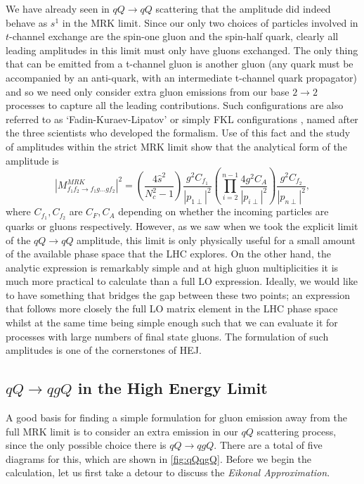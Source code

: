 We have already seen in $qQ \to qQ$ scattering that the amplitude did indeed behave as $s^1$ in the MRK limit. Since our only two choices of particles involved in $t$-channel exchange are the spin-one gluon and the spin-half quark, clearly all leading amplitudes in this limit must only have gluons exchanged. The only thing that can be emitted from a t-channel gluon is another gluon (any quark must be accompanied by an anti-quark, with an intermediate t-channel quark propagator) and so we need only consider extra gluon emissions from our base $2 \to 2$ processes to capture all the leading contributions. Such configurations are also referred to as `Fadin-Kuraev-Lipatov' or simply FKL configurations \cite{Kuraev1976}, named after the three scientists who developed the formalism. Use of this fact and the study of amplitudes within the strict MRK limit \cite{DelDuca1995, Andersen2009a} show that the analytical form of the amplitude is
\begin{equation}
|M^{MRK}_{f_1 f_2 \to f_1 g ... g f_2}|^2 = \left(\frac{4 \hat{s}^2}{N_c^2 - 1} \right) \frac{g^2 C_{f_1}}{|p_{1 \perp}|^2} \left(\prod_{i = 2}^{n-1} \frac{4 g^2 C_A}{|p_{i \perp}|^2} \right)  \frac{g^2 C_{f_2}}{|p_{n \perp}|^2} ,
\end{equation}
where $C_{f_1}, C_{f_2}$ are $C_F, C_A $ depending on whether the incoming particles are quarks or gluons respectively. However, as we saw when we took the explicit limit of the $qQ \to qQ$ amplitude, this limit is only physically useful for a small amount of the available phase space that the LHC explores. On the other hand, the analytic expression is remarkably simple and at high gluon multiplicities it is much more practical to calculate than a full LO expression. Ideally, we would like to have something that bridges the gap between these two points; an expression that follows more closely the full LO matrix element in the LHC phase space whilst at the same time being simple enough such that we can evaluate it for processes with large numbers of final state gluons. The formulation of such amplitudes is one of the cornerstones of HEJ. 

\subsection{$qQ \to qgQ$ in the High Energy Limit}

A good basis for finding a simple formulation for gluon emission away from the full MRK limit is to consider an extra emission in our $qQ$ scattering process, since the only possible choice there is $qQ \to qgQ$. There are a total of five diagrams for this, which are shown in \ref{fig:qQqgQ}. Before we begin the calculation, let us first take a detour to discuss the \emph{Eikonal Approximation}.


